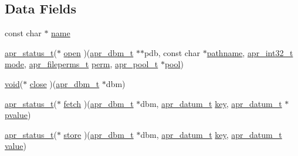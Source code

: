 \subsection*{Data Fields}
\begin{DoxyCompactItemize}
\item 
const char $\ast$ \hyperlink{structapr__dbm__type__t_af023b97eba22415785caf005fc5dcf64}{name}
\item 
\hyperlink{group__apr__errno_gaa5105fa83cc322f09382292db8b47593}{apr\+\_\+status\+\_\+t}($\ast$ \hyperlink{structapr__dbm__type__t_a823966386777dcdc76081cccb7c493e1}{open} )(\hyperlink{structapr__dbm__t}{apr\+\_\+dbm\+\_\+t} $\ast$$\ast$pdb, const char $\ast$\hyperlink{group__APR__Util__DBM_gaf694cab4f4f6cd4b594af3c43cef1d0a}{pathname}, \hyperlink{group__apr__platform_ga21ef1e35fd3ff9be386f3cb20164ff02}{apr\+\_\+int32\+\_\+t} \hyperlink{pcregrep_8txt_ad194431669b7d1f96d2dacfb7be21261}{mode}, \hyperlink{group__apr__file__info_ga3af19c4c47007169064a70f9351bc7d8}{apr\+\_\+fileperms\+\_\+t} \hyperlink{group__APR__Util__DBM_gaa8065a83f4f6501dc243d0c894030278}{perm}, \hyperlink{structapr__pool__t}{apr\+\_\+pool\+\_\+t} $\ast$\hyperlink{group__APR__XLATE_gabb3cd978f04c73d0b763c391e9bfde73}{pool})
\item 
\hyperlink{group__MOD__ISAPI_gacd6cdbf73df3d9eed42fa493d9b621a6}{void}($\ast$ \hyperlink{structapr__dbm__type__t_ad279fc2ecb08cb1c8b4dc93feacb8491}{close} )(\hyperlink{structapr__dbm__t}{apr\+\_\+dbm\+\_\+t} $\ast$dbm)
\item 
\hyperlink{group__apr__errno_gaa5105fa83cc322f09382292db8b47593}{apr\+\_\+status\+\_\+t}($\ast$ \hyperlink{structapr__dbm__type__t_aed236143d1ce8ee0edd76fa96332357e}{fetch} )(\hyperlink{structapr__dbm__t}{apr\+\_\+dbm\+\_\+t} $\ast$dbm, \hyperlink{structapr__datum__t}{apr\+\_\+datum\+\_\+t} \hyperlink{apr__siphash_8h_adac0b6a30345ea1d0daa8a692b0b7ad9}{key}, \hyperlink{structapr__datum__t}{apr\+\_\+datum\+\_\+t} $\ast$\hyperlink{group__APR__Util__DBM_ga28a8123792275d5480b92912a9e85b0e}{pvalue})
\item 
\hyperlink{group__apr__errno_gaa5105fa83cc322f09382292db8b47593}{apr\+\_\+status\+\_\+t}($\ast$ \hyperlink{structapr__dbm__type__t_a0c2e73a49901b9dcb80c302dd99a836b}{store} )(\hyperlink{structapr__dbm__t}{apr\+\_\+dbm\+\_\+t} $\ast$dbm, \hyperlink{structapr__datum__t}{apr\+\_\+datum\+\_\+t} \hyperlink{apr__siphash_8h_adac0b6a30345ea1d0daa8a692b0b7ad9}{key}, \hyperlink{structapr__datum__t}{apr\+\_\+datum\+\_\+t} \hyperlink{pcretest_8txt_a262ad32c75be9b93a7a77b045ed14fe0}{value})
\item 
$$
\end{DoxyCompactItemize}
